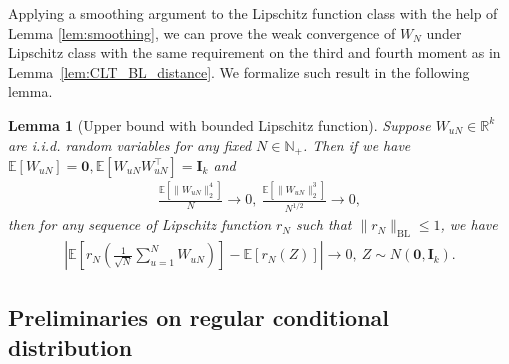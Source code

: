 \documentclass[12pt]{article}
\newtheorem{lemma}{Lemma}
\newcommand{\E}{\mathbb E}								%
\begin{document}
\noindent Applying a smoothing argument to the Lipschitz function class with the help of Lemma \ref{lem:smoothing}, we can prove the weak convergence of $W_N$ under Lipschitz class with the same requirement on the third and fourth moment as in Lemma~\ref{lem:CLT_BL_distance}. We formalize such result in the following lemma.


\begin{lemma}[Upper bound with bounded Lipschitz function]\label{lem:W_1_bound}
	Suppose $W_{uN}\in\mathbb{R}^k$ are i.i.d. random variables for any fixed $N\in\mathbb{N}_+$. Then if we have $\E[W_{uN}]=\bm 0,\E[W_{uN}W_{uN}^\top]=\bm I_k$ and 
	\begin{align*}
		\frac{\E\left[\|W_{uN}\|_2^4\right]}{N}\rightarrow 0,\ \frac{\E[\|W_{uN}\|_2^3]}{N^{1/2}}\rightarrow0,
	\end{align*}
	then for any sequence of Lipschitz function $r_N$ such that $\|r_N\|_{\mathrm{BL}}\leq 1$, we have
	\begin{align*}
		\left|\E\left[r_N\left(\frac{1}{\sqrt{N}}\sum_{u=1}^N W_{uN}\right)\right]-\E\left[r_N\left(Z\right)\right]\right|\rightarrow0,\ Z\sim N(\bm 0,\bm I_k).
	\end{align*}
\end{lemma}



\subsection{Preliminaries on regular conditional distribution}\label{sec:RCD_preliminary}
\end{document}
